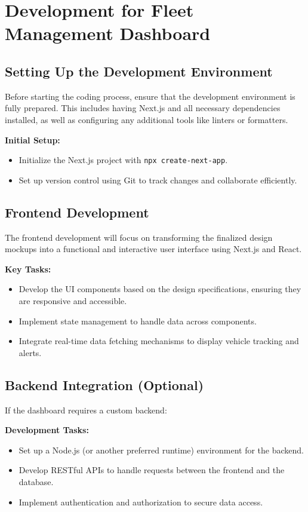 \section*{Development for Fleet Management Dashboard}

\subsection*{Setting Up the Development Environment}
Before starting the coding process, ensure that the development environment is fully prepared. This includes having Next.js and all necessary dependencies installed, as well as configuring any additional tools like linters or formatters.

\textbf{Initial Setup:}
\begin{itemize}
    \item Initialize the Next.js project with \texttt{npx create-next-app}.
    \item Set up version control using Git to track changes and collaborate efficiently.
\end{itemize}

\subsection*{Frontend Development}
The frontend development will focus on transforming the finalized design mockups into a functional and interactive user interface using Next.js and React.

\textbf{Key Tasks:}
\begin{itemize}
    \item Develop the UI components based on the design specifications, ensuring they are responsive and accessible.
    \item Implement state management to handle data across components.
    \item Integrate real-time data fetching mechanisms to display vehicle tracking and alerts.
\end{itemize}

\subsection*{Backend Integration (Optional)}
If the dashboard requires a custom backend:

\textbf{Development Tasks:}
\begin{itemize}
    \item Set up a Node.js (or another preferred runtime) environment for the backend.
    \item Develop RESTful APIs to handle requests between the frontend and the database.
    \item Implement authentication and authorization to secure data access.
\end{itemize}

